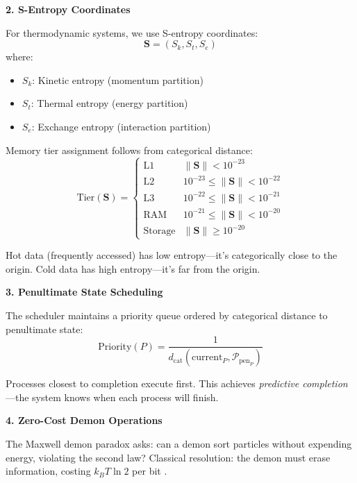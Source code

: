 \documentclass[twocolumn,10pt]{article}
\theoremstyle{definition}
\theoremstyle{remark}
\newcommand{\pentstate}{\mathcal{P}_{\text{pen}}}
\newcommand{\Scoord}{\mathbf{S}}
\newcommand{\dcat}{d_{\text{cat}}}
\begin{document}
\textbf{2. S-Entropy Coordinates}

For thermodynamic systems, we use S-entropy coordinates:
\begin{equation}
    \Scoord = (S_k, S_t, S_e)
\end{equation}
where:
\begin{itemize}
    \item $S_k$: Kinetic entropy (momentum partition)
    \item $S_t$: Thermal entropy (energy partition)
    \item $S_e$: Exchange entropy (interaction partition)
\end{itemize}

Memory tier assignment follows from categorical distance:
\begin{equation}
    \text{Tier}(\Scoord) = \begin{cases}
        \text{L1} & \|\Scoord\| < 10^{-23} \\
        \text{L2} & 10^{-23} \leq \|\Scoord\| < 10^{-22} \\
        \text{L3} & 10^{-22} \leq \|\Scoord\| < 10^{-21} \\
        \text{RAM} & 10^{-21} \leq \|\Scoord\| < 10^{-20} \\
        \text{Storage} & \|\Scoord\| \geq 10^{-20}
    \end{cases}
\end{equation}

Hot data (frequently accessed) has low entropy—it's categorically close to the origin. Cold data has high entropy—it's far from the origin.

\textbf{3. Penultimate State Scheduling}

The scheduler maintains a priority queue ordered by categorical distance to penultimate state:
\begin{equation}
    \text{Priority}(P) = \frac{1}{\dcat(\text{current}_P, \pentstate_P)}
\end{equation}

Processes closest to completion execute first. This achieves \emph{predictive completion}—the system knows when each process will finish.

\textbf{4. Zero-Cost Demon Operations}

The Maxwell demon paradox asks: can a demon sort particles without expending energy, violating the second law? Classical resolution: the demon must erase information, costing $k_B T \ln 2$ per bit \citep{landauer1961,bennett1982}.
\end{document}
